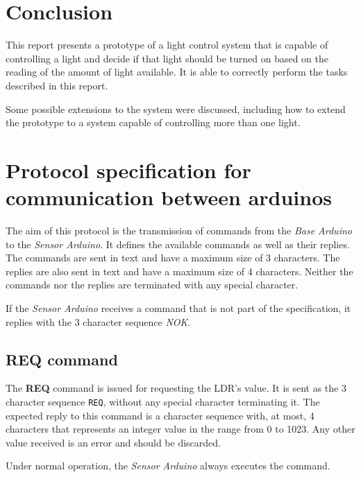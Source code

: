 \documentclass[conference, a4paper]{IEEEtran}
\begin{document}
\section{Conclusion}
\label{conc}

This report presents a prototype of a light control system that is capable of controlling a light and decide if that light should be turned on based on the reading of the amount of light available. It is able to correctly perform the tasks described in this report.

Some possible extensions to the system were discussed, including how to extend the prototype to a system capable of controlling more than one light.




\clearpage
\setcounter{page}{1}

\appendices

\section{Protocol specification for communication between arduinos}
\label{prot_ard}

The aim of this protocol is the transmission of commands from the \textit{Base Arduino} to the \textit{Sensor Arduino}. It defines the available commands as well as their replies. The commands are sent in text and have a maximum size of 3 characters. The replies are also sent in text and have a maximum size of 4 characters. Neither the commands nor the replies are terminated with any special character.

If the \textit{Sensor Arduino} receives a command that is not part of the specification, it replies with the 3 character sequence \textit{NOK}.

\subsection{REQ command}

The \textbf{REQ} command is issued for requesting the LDR's value. It is sent as the 3 character sequence \texttt{REQ}, without any special character terminating it. The expected reply to this command is a character sequence with, at most, 4 characters that represents an integer value in the range from 0 to 1023. Any other value received is an error and should be discarded.

Under normal operation, the \textit{Sensor Arduino} always executes the command.
\end{document}
